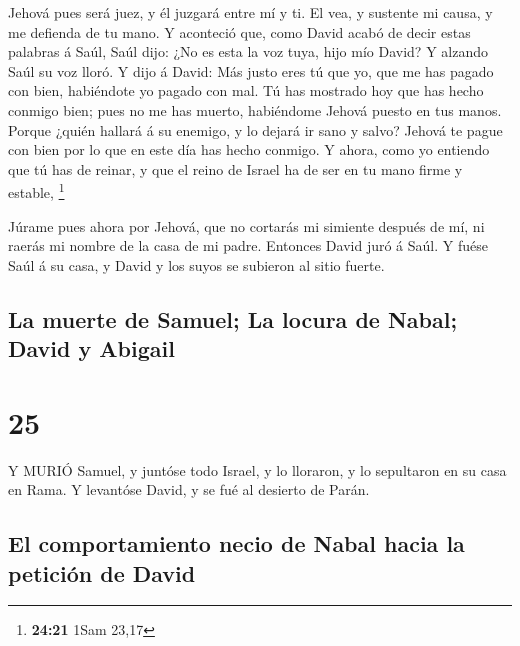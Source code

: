  Jehová pues será juez, y él juzgará entre mí y ti. El vea,
y sustente mi causa, y me defienda de tu mano.  Y aconteció
que, como David acabó de decir estas palabras á Saúl, Saúl dijo: ¿No es
esta la voz tuya, hijo mío David? Y alzando Saúl su voz lloró.
 Y dijo á David: Más justo eres tú que yo, que me has
pagado con bien, habiéndote yo pagado con mal.  Tú has
mostrado hoy que has hecho conmigo bien; pues no me has muerto,
habiéndome Jehová puesto en tus manos.  Porque ¿quién
hallará á su enemigo, y lo dejará ir sano y salvo? Jehová te pague con
bien por lo que en este día has hecho conmigo.  Y ahora,
como yo entiendo que tú has de reinar, y que el reino de Israel ha de
ser en tu mano firme y estable, \footnote{\textbf{24:21} 1Sam 23,17}

 Júrame pues ahora por Jehová, que no cortarás mi simiente
después de mí, ni raerás mi nombre de la casa de mi padre. Entonces
David juró á Saúl. Y fuése Saúl á su casa, y David y los suyos se
subieron al sitio fuerte.

\hypertarget{la-muerte-de-samuel-la-locura-de-nabal-david-y-abigail}{%
\subsection{La muerte de Samuel; La locura de Nabal; David y
Abigail}\label{la-muerte-de-samuel-la-locura-de-nabal-david-y-abigail}}

\hypertarget{section-24}{%
\section{25}\label{section-24}}

 Y MURIÓ Samuel, y juntóse todo Israel, y lo lloraron, y lo
sepultaron en su casa en Rama. Y levantóse David, y se fué al desierto
de Parán.

\hypertarget{el-comportamiento-necio-de-nabal-hacia-la-peticiuxf3n-de-david}{%
\subsection{El comportamiento necio de Nabal hacia la petición de
David}\label{el-comportamiento-necio-de-nabal-hacia-la-peticiuxf3n-de-david}}

